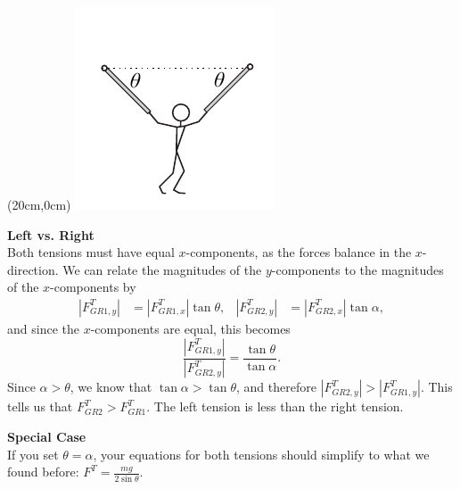 \documentclass[]{article}
\begin{document}
\begin{textblock*}{5cm}(20cm,0cm)
\centering
\includegraphics[scale=2]{Gymnast_Suspended_with_Equal_Angles}
\end{textblock*}
\newpage
\begin{TeacherMargin}
\begin{center}
\end{center}
\textbf{Left vs. Right} \\
Both tensions must have equal $x$-components, as the forces balance in the $x$-direction. We can relate the magnitudes of the $y$-components to the magnitudes of the $x$-components by
\begin{align*}
	|F^{T}_{GR1,y}| & = |F^{T}_{GR1,x}|\tan\theta, & |F^{T}_{GR2,y}| & = |F^{T}_{GR2,x}|\tan\alpha,
\end{align*}
and since the $x$-components are equal, this becomes
\[
\frac{|F^{T}_{GR1,y}|}{|F^{T}_{GR2,y}|} = \frac{\tan\theta}{\tan\alpha}.
\]
Since $\alpha>\theta$, we know that $\tan\alpha>\tan\theta$, and therefore $|F^{T}_{GR2,y}| > |F^{T}_{GR1,y}|$. This tells us that $F^{T}_{GR2} > F^{T}_{GR1}$. The left tension is less than the right tension.

\noindent\textbf{Special Case} \\
If you set $\theta=\alpha$, your equations for both tensions should simplify to what we found before: $F^{T} = \frac{mg}{2\sin\theta}$.
\end{TeacherMargin}
\end{document}
